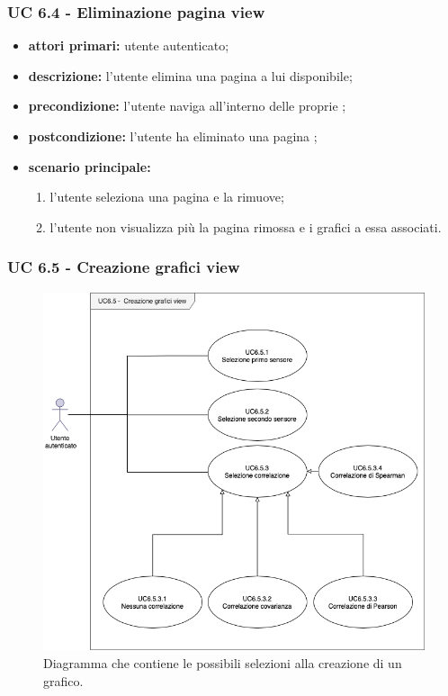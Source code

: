 			\subsubsection{UC 6.4 - Eliminazione pagina view}
			\begin{itemize}
				\item \textbf{attori primari:} utente autenticato;
				\item \textbf{descrizione:} l'utente elimina una pagina  a lui disponibile;
				\item \textbf{precondizione:} l'utente naviga all'interno delle proprie ;
				\item \textbf{postcondizione:} l'utente ha eliminato una pagina ;
				\item \textbf{scenario principale:}
				\begin{enumerate}
					\item l'utente seleziona una pagina  e la rimuove;
					\item l'utente non visualizza più la pagina  rimossa e i grafici a essa associati.
				\end{enumerate}
			\end{itemize}

			\subsubsection{UC 6.5 - Creazione grafici view}

			\begin{figure}[H]
				\centering
				\includegraphics[scale=0.60]{res/images/uc6.5}
				\caption{Diagramma che contiene le possibili selezioni alla creazione di un grafico.}
			\end{figure}

